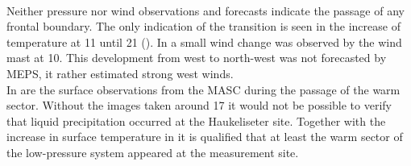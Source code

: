 \\
Neither pressure nor wind observations and forecasts indicate the passage of any frontal boundary. The only indication of the transition is seen in the increase of temperature at \SI{11}{\UTC} until \SI{21}{\UTC} (). In  a small wind change was observed by the wind mast at \SI{10}{\UTC}. This development from west to north-west was not forecasted by MEPS, it rather estimated strong west winds.
\\
In  are the surface observations from the MASC during the passage of the warm sector. Without the images taken around \SI{17}{\UTC} it would not be possible to verify that liquid precipitation occurred at the Haukeliseter site. Together with the increase in surface temperature in  it is qualified that at least the warm sector of the low-pressure system appeared at the measurement site.
%
